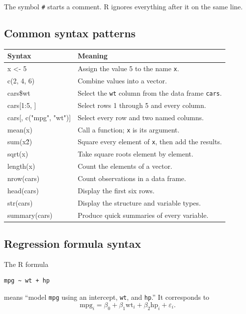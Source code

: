 \documentclass[11pt]{article}
\begin{document}
The symbol \texttt{\#} starts a comment. R ignores everything after it on the
same line.

\subsection{Common syntax patterns}

\begin{longtable}{>{\ttfamily}p{}p{}}
\toprule
\normalfont Syntax & Meaning\\
\midrule
\endhead
x <- 5 & Assign the value 5 to the name \texttt{x}.\\
c(2, 4, 6) & Combine values into a vector.\\
cars\$wt & Select the \texttt{wt} column from the data frame \texttt{cars}.\\
cars[1:5, ] & Select rows 1 through 5 and every column.\\
cars[, c("mpg", "wt")] & Select every row and two named columns.\\
mean(x) & Call a function; \texttt{x} is its argument.\\
sum(x\^2) & Square every element of \texttt{x}, then add the results.\\
sqrt(x) & Take square roots element by element.\\
length(x) & Count the elements of a vector.\\
nrow(cars) & Count observations in a data frame.\\
head(cars) & Display the first six rows.\\
str(cars) & Display the structure and variable types.\\
summary(cars) & Produce quick summaries of every variable.\\
\bottomrule
\end{longtable}

\subsection{Regression formula syntax}

The R formula
\begin{lstlisting}
mpg ~ wt + hp
\end{lstlisting}
means ``model \texttt{mpg} using an intercept, \texttt{wt}, and \texttt{hp}.''
It corresponds to
\[
  \mathrm{mpg}_i=\beta_0+\beta_1\mathrm{wt}_i
                  +\beta_2\mathrm{hp}_i+\varepsilon_i.
\]
\end{document}
